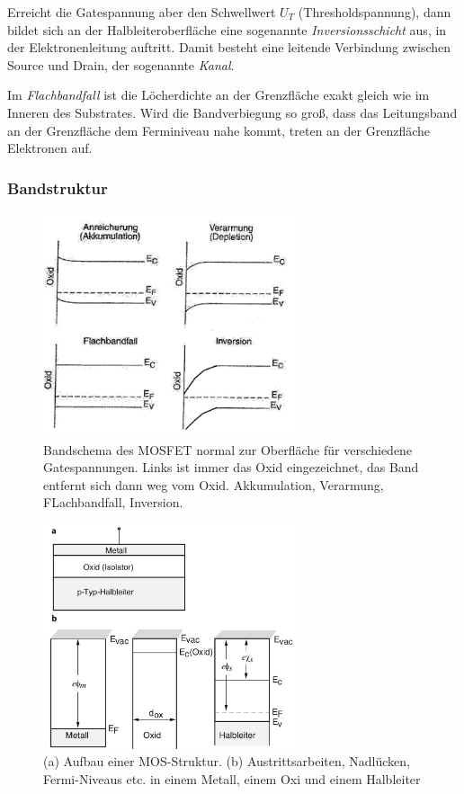     Erreicht die Gatespannung aber den Schwellwert $U_T$ (Thresholdspannung), dann bildet sich an der Halbleiteroberfläche eine sogenannte \textit{Inversionsschicht} aus, in der Elektronenleitung auftritt. Damit besteht eine leitende Verbindung zwischen Source und Drain, der sogenannte \textit{Kanal}. 
    
    Im \textit{Flachbandfall} ist die Löcherdichte an der Grenzfläche exakt gleich wie im Inneren des Substrates. Wird die Bandverbiegung so groß, dass das Leitungsband an der Grenzfläche dem Ferminiveau nahe kommt, treten an der Grenzfläche Elektronen auf. 
    
    
    \subsubsection{Bandstruktur}
    
    \begin{figure}
        \centering
        \includegraphics[width=0.66\textwidth]{fig/mos-bänder2.jpg}
        \caption{Bandschema des MOSFET normal zur Oberfläche für verschiedene Gatespannungen. 
        Links ist immer das Oxid eingezeichnet, das Band entfernt sich dann weg vom Oxid. Akkumulation, Verarmung, FLachbandfall, Inversion.}
        \label{fig:mos-bänder2}
    \end{figure}
    
    
    \begin{figure}
        \centering
        \includegraphics[width=0.66\textwidth]{fig/mos-bänder1.jpg}
        \caption{(a) Aufbau einer MOS-Struktur. (b) Austrittsarbeiten, Nadlücken, Fermi-Niveaus etc. in einem Metall, einem Oxi und einem Halbleiter}
        \label{fig:mos-bänder1}
    \end{figure}
    
